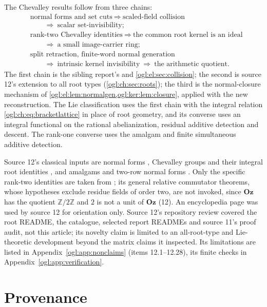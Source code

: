 \documentclass[11pt,oneside]{article}
\numberwithin{equation}{section}
\theoremstyle{definition}
\theoremstyle{remark}
\newcommand{\Oz}{\mathbf{Oz}}
\newcommand{\Z}{\mathbb Z}
\begin{document}
The Chevalley results follow from three chains:
\begin{align*}
 &\text{normal forms and set cuts}\ \Longrightarrow\ \text{scaled-field collision}\\
 &\qquad\Longrightarrow\ \text{scalar set-invisibility};\\
 &\text{rank-two Chevalley identities}\ \Longrightarrow\ \text{the common root kernel is an ideal}\\
 &\qquad\Longrightarrow\ \text{a small image-carrier ring};\\
 &\text{split retraction, finite-word normal generation}\\
 &\qquad\Longrightarrow\ \text{intrinsic kernel invisibility}\ \Longrightarrow\ \text{the arithmetic quotient}.
\end{align*}
The first chain is the sibling report's and \cref{ogl:el:sec:collision}; the
second is source 12's extension to all root types
(\cref{ogl:ch:sec:roots}); the third is the normal-closure mechanism of
\cref{ogl:el:lem:normalgen,ogl:ker:lem:closure}, applied with the new
reconstruction. The Lie classification uses the first chain with the integral
relation \eqref{ogl:ch:eq:bracketlattice} in place of root geometry, and its
converse uses an integral functional on the rational abelianization, residual
additive detection and descent. The rank-one converse uses the amalgam and
finite simultaneous additive detection.

Source 12's classical inputs are normal forms \cite{Conway,Gonshor}, Chevalley
groups and their integral root identities \cite{Geck,HVZ}, and amalgams and
two-row normal forms \cite{Cohn,Serre}. Only the specific rank-two identities are
taken from \cite{HVZ}; its general relative commutator theorems, whose hypotheses
exclude residue fields of order two, are not invoked, since $\Oz$ has the
quotient $\Z/2\Z$ and $2$ is not a unit of $\Oz$ (12). An encyclopedia page was
used by source 12 for orientation only. Source 12's repository review covered
the root README, the catalogue, selected report READMEs and source 11's proof
audit, not this article; its novelty claim is limited to an all-root-type and
Lie-theoretic development beyond the matrix claims it inspected. Its limitations
are listed in Appendix~\ref{ogl:app:nonclaims} (items 12.1--12.28), its finite
checks in Appendix~\ref{ogl:app:verification}.

\appendix
\section{Provenance}\label{ogl:app:provenance}
\end{document}
